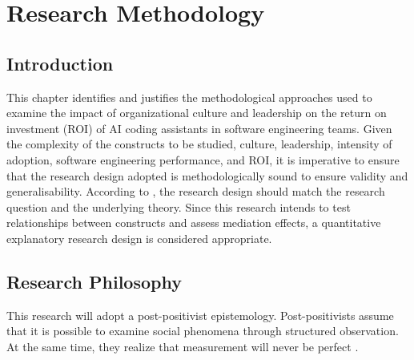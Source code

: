 \chapter{Research Methodology} %
\label{cha:ch3_methodology} %

\section{Introduction}
\label{sec:Introduction}
This chapter identifies and justifies the methodological approaches used to examine the impact of organizational culture and leadership on the return on investment (ROI) of AI coding assistants in software engineering teams. Given the complexity of the constructs to be studied, culture, leadership, intensity of adoption, software engineering performance, and ROI, it is imperative to ensure that the research design adopted is methodologically sound to ensure validity and generalisability. According to \textcite{Creswell2018}, the research design should match the research question and the underlying theory. Since this research intends to test relationships between constructs and assess mediation effects, a quantitative explanatory research design is considered appropriate. 

\section{Research Philosophy}
\label{sec:Research Philosophy}
This research will adopt a post-positivist epistemology. Post-positivists assume that it is possible to examine social phenomena through structured observation. At the same time, they realize that measurement will never be perfect \autocite{Creswell2018}.

